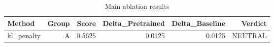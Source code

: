 \begin{table}[htbp]
\centering
\caption{Main ablation results}
\label{tab:main-results}
\begin{tabular}{lrrrrr}
\toprule
\textbf{Method} & \textbf{Group} & \textbf{Score} & \textbf{Delta\_Pretrained} & \textbf{Delta\_Baseline} & \textbf{Verdict} \\
\midrule
kl\_penalty & A & 0.5625 & 0.0125 & 0.0125 & NEUTRAL \\
\bottomrule
\end{tabular}
\end{table}